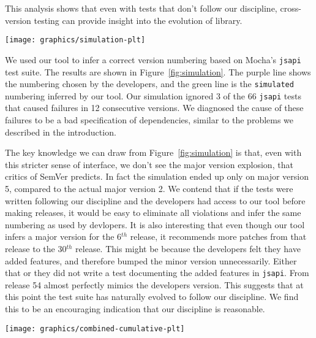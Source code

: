 This analysis shows that even with tests that don't follow our
discipline, cross-version testing can provide insight into the
evolution of library.

\begin{figure*}
\centering
\texttt{[image: graphics/simulation-plt]}
\caption{Simulation of version histories}%
\label{fig:simulation}
\end{figure*}

We used our tool to infer a correct version numbering based on Mocha's
{\tt jsapi} test suite. The results are shown in
Figure~\ref{fig:simulation}. The purple line shows the numbering
chosen by the developers, and the green line is the {\tt simulated}
numbering inferred by our tool.  Our simulation ignored 3 of the 66
{\tt jsapi} tests that caused failures in 12 consecutive versions. We
diagnosed the cause of these failures to be a bad specification of
dependencies, similar to the problems we described in the
introduction.

The key knowledge we can draw from Figure~\ref{fig:simulation} is
that, even with this stricter sense of interface, we don't see the
major version explosion, that critics\cite{crawford-not-semver,
  backbone-2888, exoplayer-1382} of SemVer predicts. In fact the
simulation ended up only on major version 5, compared to the actual
major version 2. We contend that if the tests were written following
our discipline and the developers had access to our tool before making
releases, it would be easy to eliminate all violations and infer the
same numbering as used by devlopers. It is also interesting that even
though our tool infers a major version for the 6$^{th}$ release, it
recommends more patches from that release to the 30$^{th}$
release. This might be because the developers felt they have added
features, and therefore bumped the minor version unnecessarily. Either
that or they did not write a test documenting the added features in
{\tt jsapi}. From release 54 almost perfectly mimics the developers
version. This suggests that at this point the test suite has naturally
evolved to follow our discipline. We find this to be an encouraging
indication that our discipline is reasonable.

\begin{figure*}
\centering
\texttt{[image: graphics/combined-cumulative-plt]}
\caption{Cumulative names of violated tests} 
\label{fig:cumulative}
\end{figure*}

